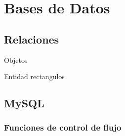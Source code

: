 \part{Bases de Datos}
\chapter{Relaciones}

Objetos 

Entidad rectangulos

\chapter{MySQL}

\section{Funciones de control de flujo}
